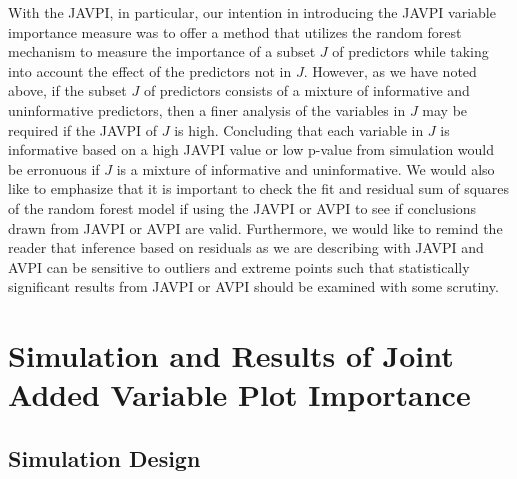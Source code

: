 \documentclass[12pt,twoside]{reedthesis}
\theoremstyle{definition}
\theoremstyle{definition}
\theoremstyle{definition}
\theoremstyle{remark}
\begin{document}
With the JAVPI, in particular, our intention in introducing the JAVPI
variable importance measure was to offer a method that utilizes the
random forest mechanism to measure the importance of a subset \(J\) of
predictors while taking into account the effect of the predictors not in
\(J\). However, as we have noted above, if the subset \(J\) of
predictors consists of a mixture of informative and uninformative
predictors, then a finer analysis of the variables in \(J\) may be
required if the JAVPI of \(J\) is high. Concluding that each variable in
\(J\) is informative based on a high JAVPI value or low p-value from
simulation would be erronuous if \(J\) is a mixture of informative and
uninformative. We would also like to emphasize that it is important to
check the fit and residual sum of squares of the random forest model if
using the JAVPI or AVPI to see if conclusions drawn from JAVPI or AVPI
are valid. Furthermore, we would like to remind the reader that
inference based on residuals as we are describing with JAVPI and AVPI
can be sensitive to outliers and extreme points such that statistically
significant results from JAVPI or AVPI should be examined with some
scrutiny. \par

\section{Simulation and Results of Joint Added Variable Plot
Importance}\label{simulation-and-results-of-joint-added-variable-plot-importance}

\subsection{Simulation Design}\label{simulation-design-1}
\end{document}

